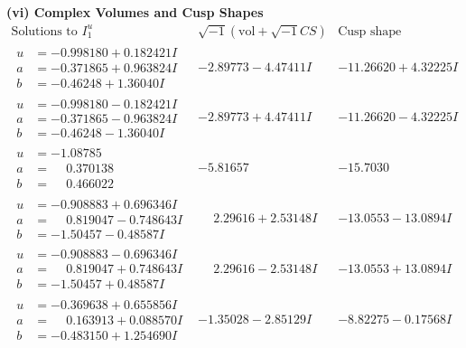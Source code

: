 \documentclass[1p]{elsarticle_modified}
\theoremstyle{definition}
\newcommand{\I}{\sqrt{-1}}
\begin{document}
\newpage\flushleft \textbf{(vi) Complex Volumes and Cusp Shapes}
$$\begin{array}{c|c|c}  
\text{Solutions to }I^u_{1}& \I (\text{vol} + \sqrt{-1}CS) & \text{Cusp shape}\\
 \hline 
\begin{aligned}
u &= -0.998180 + 0.182421 I \\
a &= -0.371865 + 0.963824 I \\
b &= -0.46248 + 1.36040 I\end{aligned}
 & -2.89773 - 4.47411 I & -11.26620 + 4.32225 I \\ \hline\begin{aligned}
u &= -0.998180 - 0.182421 I \\
a &= -0.371865 - 0.963824 I \\
b &= -0.46248 - 1.36040 I\end{aligned}
 & -2.89773 + 4.47411 I & -11.26620 - 4.32225 I \\ \hline\begin{aligned}
u &= -1.08785\phantom{ +0.000000I} \\
a &= \phantom{-}0.370138\phantom{ +0.000000I} \\
b &= \phantom{-}0.466022\phantom{ +0.000000I}\end{aligned}
 & -5.81657\phantom{ +0.000000I} & -15.7030\phantom{ +0.000000I} \\ \hline\begin{aligned}
u &= -0.908883 + 0.696346 I \\
a &= \phantom{-}0.819047 - 0.748643 I \\
b &= -1.50457 - 0.48587 I\end{aligned}
 & \phantom{-}2.29616 + 2.53148 I & -13.0553 - 13.0894 I \\ \hline\begin{aligned}
u &= -0.908883 - 0.696346 I \\
a &= \phantom{-}0.819047 + 0.748643 I \\
b &= -1.50457 + 0.48587 I\end{aligned}
 & \phantom{-}2.29616 - 2.53148 I & -13.0553 + 13.0894 I \\ \hline\begin{aligned}
u &= -0.369638 + 0.655856 I \\
a &= \phantom{-}0.163913 + 0.088570 I \\
b &= -0.483150 + 1.254690 I\end{aligned}
 & -1.35028 - 2.85129 I & -8.82275 - 0.17568 I \\ \hline\begin{aligned}

\end{aligned}
\end{array}$$
\end{document}
